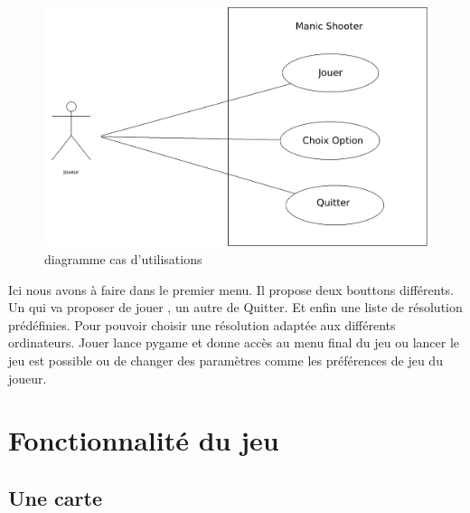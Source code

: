 \documentclass[a4paper, 11pt]{article}
\begin{document}
 \begin{figure}[ht!]
 \centering
 \includegraphics[width=1.1\linewidth]{diagfinal.png}
 \caption{diagramme cas d'utilisations}
 \label{fig::example::one}
\end{figure}

Ici nous avons à faire dans le premier menu. Il propose deux bouttons différents. Un qui va proposer de jouer , un autre de Quitter. Et enfin une liste de résolution prédéfinies. Pour pouvoir choisir une résolution adaptée aux différents ordinateurs.
Jouer lance pygame et donne accès au menu final du jeu ou lancer le jeu est possible ou de changer des paramètres comme les préférences de jeu du joueur.


\section{Fonctionnalité du jeu}


 	\subsection{Une carte}
 	
\end{document}
